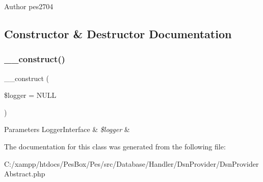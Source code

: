 \begin{DoxyAuthor}{Author}
pes2704 
\end{DoxyAuthor}


\subsection{Constructor \& Destructor Documentation}
\mbox{\label{class_pes_1_1_database_1_1_handler_1_1_dsn_provider_1_1_dsn_provider_abstract_a4d086b03f47931c183f0414bf2da5103}} 
\subsubsection{\texorpdfstring{\+\_\+\+\_\+construct()}{\_\_construct()}}
{\footnotesize\ttfamily \+\_\+\+\_\+construct (\begin{DoxyParamCaption}\item[{Logger\+Interface}]{\$logger = {\ttfamily NULL} }\end{DoxyParamCaption})}


\begin{DoxyParams}[1]{Parameters}
Logger\+Interface & {\em \$logger} & \\
\hline
\end{DoxyParams}


The documentation for this class was generated from the following file\+:\begin{DoxyCompactItemize}
\item 
C\+:/xampp/htdocs/\+Pes\+Box/\+Pes/src/\+Database/\+Handler/\+Dsn\+Provider/Dsn\+Provider\+Abstract.\+php\end{DoxyCompactItemize}
